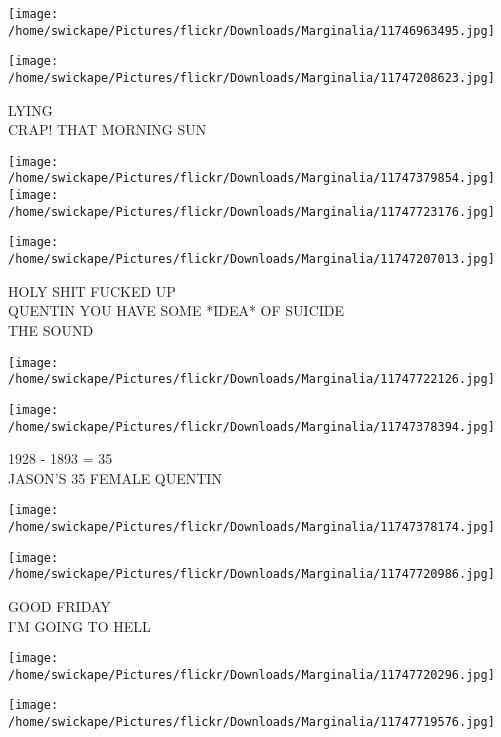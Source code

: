 \documentclass[10pt,letterpaper]{article}
\begin{document}
\texttt{[image: /home/swickape/Pictures/flickr/Downloads/Marginalia/11746963495.jpg]}

\vspace{0.25in}
\texttt{[image: /home/swickape/Pictures/flickr/Downloads/Marginalia/11747208623.jpg]}

LYING\\
CRAP! THAT MORNING SUN\\
\pagebreak

\texttt{[image: /home/swickape/Pictures/flickr/Downloads/Marginalia/11747379854.jpg]}
\texttt{[image: /home/swickape/Pictures/flickr/Downloads/Marginalia/11747723176.jpg]}

\vspace{0.25in}
\texttt{[image: /home/swickape/Pictures/flickr/Downloads/Marginalia/11747207013.jpg]}

HOLY SHIT FUCKED UP\\
QUENTIN YOU HAVE SOME *IDEA* OF SUICIDE\\
THE SOUND\\
\pagebreak

\texttt{[image: /home/swickape/Pictures/flickr/Downloads/Marginalia/11747722126.jpg]}

\vspace{0.25in}
\texttt{[image: /home/swickape/Pictures/flickr/Downloads/Marginalia/11747378394.jpg]}

1928 {-} 1893 = 35\\
JASON'S 35 FEMALE QUENTIN\\
\pagebreak

\texttt{[image: /home/swickape/Pictures/flickr/Downloads/Marginalia/11747378174.jpg]}

\vspace{0.25in}
\texttt{[image: /home/swickape/Pictures/flickr/Downloads/Marginalia/11747720986.jpg]}

GOOD FRIDAY\\
I'M GOING TO HELL\\
\pagebreak

\texttt{[image: /home/swickape/Pictures/flickr/Downloads/Marginalia/11747720296.jpg]}

\vspace{0.25in}
\texttt{[image: /home/swickape/Pictures/flickr/Downloads/Marginalia/11747719576.jpg]}
\end{document}
